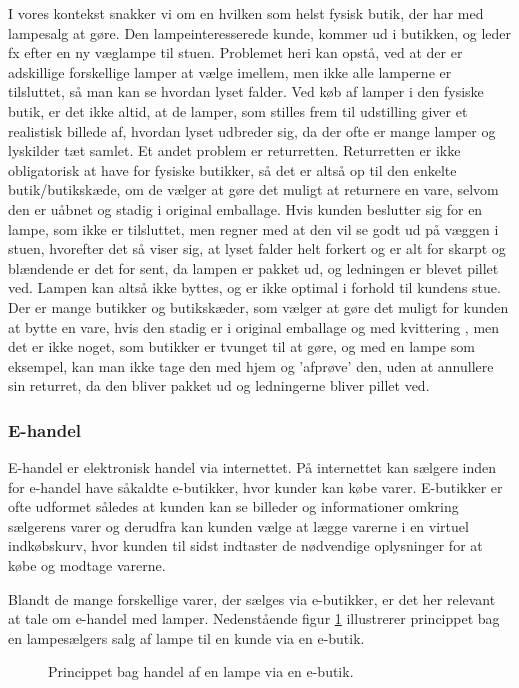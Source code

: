 I vores kontekst snakker vi om en hvilken som helst fysisk butik, der har med lampesalg at gøre. Den lampeinteresserede kunde, kommer ud i butikken, og leder fx efter en ny væglampe til stuen. Problemet heri kan opstå, ved at der er adskillige forskellige lamper at vælge imellem, men ikke alle lamperne er tilsluttet, så man kan se hvordan lyset falder. Ved køb af lamper i den fysiske butik, er det ikke altid, at de lamper, som stilles frem til udstilling giver et realistisk billede af, hvordan lyset udbreder sig, da der ofte er mange lamper og lyskilder tæt samlet. Et andet problem er returretten. Returretten er ikke obligatorisk at have for fysiske butikker, så det er altså op til den enkelte butik/butikskæde, om de vælger at gøre det muligt at returnere en vare, selvom den er uåbnet og stadig i original emballage. \cite{fortrydelsesret} Hvis kunden beslutter sig for en lampe, som ikke er tilsluttet, men regner med at den vil se godt ud på væggen i stuen, hvorefter det så viser sig, at lyset falder helt forkert og er alt for skarpt og blændende er det for sent, da lampen er pakket ud, og ledningen er blevet pillet ved. Lampen kan altså ikke byttes, og er ikke optimal i forhold til kundens stue. Der er mange butikker og butikskæder, som vælger at gøre det muligt for kunden at bytte en vare, hvis den stadig er i original emballage og med kvittering \cite{ikea_returret}, men det er ikke noget, som butikker er tvunget til at gøre, og med en lampe som eksempel, kan man ikke tage den med hjem og ’afprøve’ den, uden at annullere sin returret, da den bliver pakket ud og ledningerne bliver pillet ved.


\subsubsection{E-handel}
E-handel er elektronisk handel via internettet\cite{ddo_ehandel}. På internettet kan sælgere inden for e-handel have såkaldte e-butikker, hvor kunder kan købe varer\cite{ddo_ebutik}. E-butikker er ofte udformet således at kunden kan se billeder og informationer omkring sælgerens varer og derudfra kan kunden vælge at lægge varerne i en virtuel indkøbskurv, hvor kunden til sidst indtaster de nødvendige oplysninger for at købe og modtage varerne.


Blandt de mange forskellige varer, der sælges via e-butikker, er det her relevant at tale om e-handel med lamper. Nedenstående figur \ref{fig:e_handel_med_lamper} illustrerer princippet bag en lampesælgers salg af lampe til en kunde via en e-butik.
\begin{figure}[H]
	\centering
	\def\svgwidth{\columnwidth}
	
	\caption{Princippet bag handel af en lampe via en e-butik.}
    \label{fig:e_handel_med_lamper}
\end{figure}

